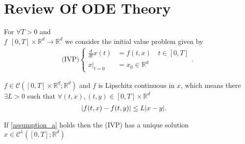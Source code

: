 \section{Review Of ODE Theory}
\begin{definition}\label{ivp}
  For $\forall T > 0$ and\\ $f\:\ [0,T] \times  \mathbb{R}^{d} \to \mathbb{R}^{d} $ we consider the initial value problem given by
  \begin{align*}
    \text{(IVP)} \begin{cases}
     \frac{d}{dt} x(t) &= f(t,x) \quad t \in  [0,T]\\
     x \rvert_{t=0} &= x_{0} \in  \mathbb{R}^d
     \end{cases}
  .\end{align*}
\end{definition}
\begin{assumption}\label{assumption_a}
  $f \in  \mathcal{C}([0,T] \times  \mathbb{R}^{d} ; \mathbb{R}^{d}  )$  and 
  $f$ is Lipschitz continuous in $x$, which means there $\exists L >0$ such that 
    $\forall (t,x),(t,y) \in  [0,T] \times \mathbb{R}^{d}$
  \begin{align*}
    &\lvert f(t,x) - f(t,y)\rvert \le  L \lvert x-y\rvert
  .\end{align*}
\end{assumption}
\begin{theorem}\label{existence_uniqueness}
  If \autoref{assumption_a} holds then the (IVP) has a unique solution $x \in  \mathcal{C}^{1}([0,T];\mathbb{R}^{d} ) $
\end{theorem}
